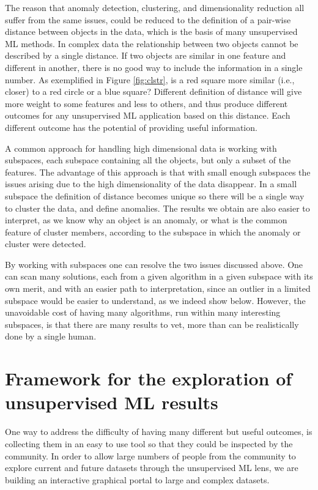 \documentclass[fleqn,usenatbib]{mnras}
\begin{document}
{The reason that anomaly detection, clustering, and dimensionality reduction all suffer from the same issues, could be reduced to the definition of a pair-wise distance between objects in the data, which is the basis of many unsupervised ML methods. In complex data the relationship between two objects cannot be described by a single distance. If two objects are similar in one feature and different in another,  there is no good way to include  the information in a single number. As exemplified in Figure \ref{fig:clstr}, is a red square more similar (i.e., closer) to a red circle or a blue square? Different definition of distance will give more weight to some features and less to others, and thus produce different outcomes for any unsupervised ML application based on this distance. Each different outcome has the potential of providing useful information. 

A common approach for handling high dimensional data is working with subspaces, each subspace containing all the objects, but only a subset of the features. The advantage of this approach is that with small enough subspaces the issues arising due to the high dimensionality of the data disappear. In a small subspace the definition of distance becomes unique so there will be a single way to cluster the data, and  define  anomalies. The results we obtain are also  easier to interpret, as we know why an object is an anomaly, or what is the common feature of cluster members, according to the subspace in which the anomaly or cluster were detected. 

By working with subspaces one can resolve the two issues discussed above. One can scan many solutions, each from a given algorithm in a given subspace with its own merit, and with an easier path to interpretation, since an outlier in a limited subspace would be easier to understand, as we indeed show below. However, the unavoidable cost of having many algorithms, run within many interesting subspaces, is that there are many results to vet, more than can be realistically done by a single human. 




\section{Framework for the exploration of unsupervised ML results}
\label{sec:toast} 




One  way to address the difficulty of having many different but useful outcomes, is collecting them in an easy to use tool so that they could be inspected by the community. In order to allow large numbers of people from the community to explore current and future datasets through the unsupervised ML lens, we are building an interactive graphical portal  to large and complex datasets. 

}
\end{document}
